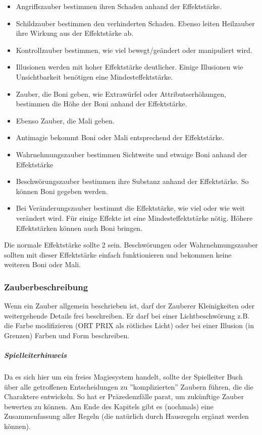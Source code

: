 \documentclass{article}
\begin{document}
\begin{itemize}
\item Angriffszauber bestimmen ihren Schaden anhand der Effektstärke.
\item Schildzauber bestimmen den verhinderten Schaden. Ebenso leiten Heilzauber ihre Wirkung aus der Effektstärke ab.
\item Kontrollzauber bestimmen, wie viel bewegt/geändert oder manipuliert wird.
\item Illusionen werden mit hoher Effektstärke deutlicher. Einige Illusionen wie Unsichtbarkeit benötigen eine Mindesteffektstärke.
\item Zauber, die Boni geben, wie Extrawürfel oder Attributserhöhungen, bestimmen die Höhe der Boni anhand der Effektstärke.
\item Ebenso Zauber, die Mali geben.
\item Antimagie bekommt Boni oder Mali entsprechend der Effektstärke.
\item Wahrnehmungszauber bestimmen Sichtweite und etwaige Boni anhand der Effektstärke
\item Beschwörungszauber bestimmen ihre Substanz anhand der Effektstärke. So können Boni gegeben werden.
\item Bei Veränderungszauber bestimmt die Effektstärke, wie viel oder wie weit verändert wird. Für einige Effekte ist eine Mindesteffektstärke nötig. Höhere Effektstärken können auch Boni bringen.
\end{itemize}

Die normale Effektstärke sollte 2 sein. Beschwörungen oder Wahrnehmungszauber sollten mit dieser Effektstärke
einfach funktionieren und bekommen keine weiteren Boni oder Mali.

\subsubsection{Zauberbeschreibung}

Wenn ein Zauber allgemein beschrieben ist, darf der Zauberer Kleinigkeiten oder weitergehende Details frei beschreiben.
Er darf bei einer Lichtbeschwörung z.B. die Farbe modifizieren (ORT PRIX als rötliches Licht) oder bei einer Illusion
(in Grenzen) Farben und Form beschreiben.

\begin{mdframed}[hidealllines=true, backgroundcolor=black!10]
\subparagraph{Spielleiterhinweis}

Da es sich hier um ein freies Magiesystem handelt, sollte der Spielleiter Buch über alle getroffenen Entscheidungen zu
''komplizierten'' Zaubern führen, die die Charaktere entwickeln. So hat er Präzedenzfälle parat, um zukünftige Zauber
bewerten zu können. Am Ende des Kapitels gibt es (nochmals) eine Zusammenfassung aller Regeln (die natürlich durch
Hausregeln ergänzt werden können).

\end{mdframed}
\end{document}
